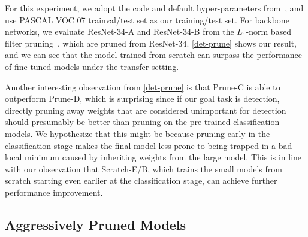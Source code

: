 For this experiment, we adopt the code and default hyper-parameters from~\cite{jjfaster2rcnn}, and use PASCAL VOC 07 trainval/test set as our training/test set. For backbone networks, we evaluate ResNet-34-A and ResNet-34-B from the $L_1$-norm based filter pruning~\cite{li2016pruning}, which are pruned from ResNet-34.
\autoref{det-prune} shows our result, and we can see that the model trained from scratch can surpass the performance of fine-tuned models under the transfer setting.


Another interesting observation from \autoref{det-prune} is that Prune-C is able to outperform Prune-D, which is surprising since if our goal task is detection, directly pruning away weights that are considered unimportant for detection should presumably be better than pruning on the pre-trained classification models. We hypothesize that this might be because pruning early in the classification stage makes the final model less prone to being trapped in a bad local minimum caused by inheriting weights from the large model. This is in line with our observation that Scratch-E/B, which trains the small models from scratch starting even earlier at the classification stage, can achieve further performance improvement.

\subsection{Aggressively Pruned Models}

